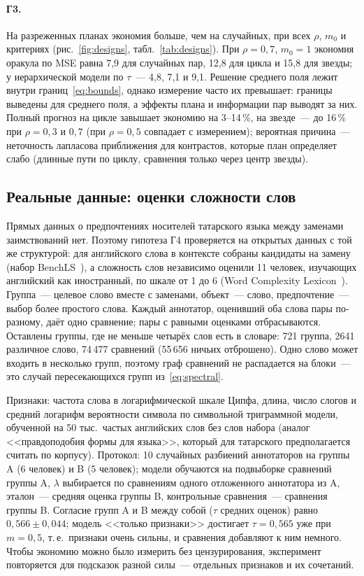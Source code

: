 \documentclass{article}
\theoremstyle{definition}
\theoremstyle{remark}
\begin{document}
\paragraph{Г3.}
На разреженных планах экономия больше, чем на случайных, при всех $\rho$, $m_0$ и критериях (рис.~\ref{fig:designs}, табл.~\ref{tab:designs}). При $\rho=0{,}7$, $m_0=1$ экономия оракула по MSE равна 7,9 для случайных пар, 12,8 для цикла и 15,8 для звезды; у иерархической модели по $\tau$~--- 4,8, 7,1 и 9,1. Решение среднего поля лежит внутри границ~\eqref{eq:bounds}, однако измерение часто их превышает: границы выведены для среднего поля, а эффекты плана и информации пар выводят за них. Полный прогноз на цикле завышает экономию на 3--14\,\%, на звезде~--- до 16\,\% при $\rho=0{,}3$ и $0{,}7$ (при $\rho=0{,}5$ совпадает с измерением); вероятная причина~--- неточность лапласова приближения для контрастов, которые план определяет слабо (длинные пути по циклу, сравнения только через центр звезды).

\subsection{Реальные данные: оценки сложности слов}
\label{sec:real}

Прямых данных о предпочтениях носителей татарского языка между заменами заимствований нет. Поэтому гипотеза Г4 проверяется на открытых данных с той же структурой: для английского слова в контексте собраны кандидаты на замену (набор BenchLS~\citep{paetzold2016benchmarking}), а сложность слов независимо оценили 11 человек, изучающих английский как иностранный, по шкале от 1 до 6 (Word Complexity Lexicon~\citep{maddela2018word}). Группа~--- целевое слово вместе с заменами, объект~--- слово, предпочтение~--- выбор более простого слова. Каждый аннотатор, оценивший оба слова пары по-разному, даёт одно сравнение; пары с равными оценками отбрасываются. Оставлены группы, где не меньше четырёх слов есть в словаре: 721 группа, 2641 различное слово, 74\,477 сравнений (55\,656 ничьих отброшено). Одно слово может входить в несколько групп, поэтому граф сравнений не распадается на блоки~--- это случай пересекающихся групп из~\eqref{eq:spectral}.

Признаки: частота слова в логарифмической шкале Ципфа, длина, число слогов и средний логарифм вероятности символа по символьной триграммной модели, обученной на 50 тыс.\ частых английских слов без слов набора (аналог <<правдоподобия формы для языка>>, который для татарского предполагается считать по корпусу). Протокол: 10 случайных разбиений аннотаторов на группы A (6 человек) и B (5 человек); модели обучаются на подвыборке сравнений группы A, $\lambda$ выбирается по сравнениям одного отложенного аннотатора из A, эталон~--- средняя оценка группы B, контрольные сравнения~--- сравнения группы B. Согласие групп A и B между собой ($\tau$ средних оценок) равно $0{,}566\pm0{,}044$; модель <<только признаки>> достигает $\tau=0{,}565$ уже при $m=0{,}5$, т.\,е.\ признаки очень сильны, и сравнения добавляют к ним немного. Чтобы экономию можно было измерить без цензурирования, эксперимент повторяется для подсказок разной силы~--- отдельных признаков и их сочетаний.
\end{document}
